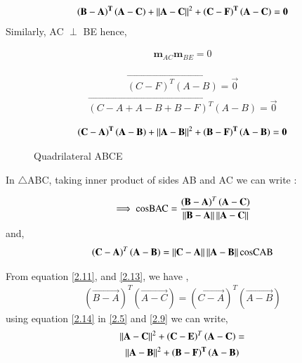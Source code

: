 \documentclass[journal,12pt,twocolumn]{IEEEtran}
\begin{document}
  \begin{align}
 \mathbf{ \left( B -  A \right)^T \left(A - C \right)} + \left\lVert\mathbf {A - C}\right\rVert^{2} + \mathbf{\left(C - F\right)^T \left(A - C \right)} = \mathbf{0} \label{2.5}
  \end{align}
Similarly, AC $\perp$ BE hence,  


 \begin{align}
 \textbf{m}_{AC} \textbf{m}_{BE} = 0
 \end{align}
 
 \begin{align}
 \vec{\left( C - F\right)^T \left(A - B \right)} =\vec{ 0}
 \end{align}
 \begin{align}
 \vec{\left( C -  A + A - B + B - F\right)^T \left(A - B \right)} = \vec{0}
 \end{align}
 
 \begin{align}
 \mathbf{ \left( C-  A \right)^T \left(A - B \right)} + \left\lVert\mathbf {A - B}\right\rVert^{2} + \mathbf{\left(B - F\right)^T \left(A - B \right)} = \mathbf{0} \label{2.9}
 \end{align}
   
\begin{figure}[!htb]
	\centering
	\centering
	\resizebox{\columnwidth}{!}{}
	\caption{Quadrilateral ABCE}
\end{figure}
  
  
  
  
  

  
   In $\triangle$ABC, taking inner product of sides  AB and AC we can write :
  
 \begin{align}
\implies \text{cosBAC} = \frac{\left( \mathbf{ B - A} \right)^T  \left( \mathbf{A - C } \right)}{\left\lVert\mathbf{ B - A}\right\rVert \left\lVert\mathbf{A - C}\right\rVert} \label{2.11}
\end{align}  
  and,
   \begin{align}
  \left( \mathbf{C - A} \right)^T \left( \mathbf{A - B} \right) = \left\lVert\mathbf{C - A}\right\rVert \left\lVert\mathbf{ A - B}\right\rVert \text{cosCAB} \label{2.13}
  \end{align}
  
  From equation \ref{2.11}, and \ref{2.13}, we have ,
  \begin{multline} 
    \left( \vec{ B - A} \right)^T  \left( \vec{A - C } \right) =  \left( \vec{ C - A} \right)^T  \left( \vec{A - B } \right) \label{2.14}
   \end{multline} 
 using equation \ref{2.14} in \ref{2.5} and \ref{2.9} we can write,
   \begin{multline} 
   \left\lVert\mathbf{A - C}\right\rVert^2 + \left ( \mathbf{ C - E }\right)^T \left( \mathbf{A - C} \right)  =  \\ \left\lVert\mathbf{A - B}\right\rVert^2 + \mathbf{\left (  B - F\right)^{T} \left( A - B \right)}
    \end{multline} 
   
\end{document}
